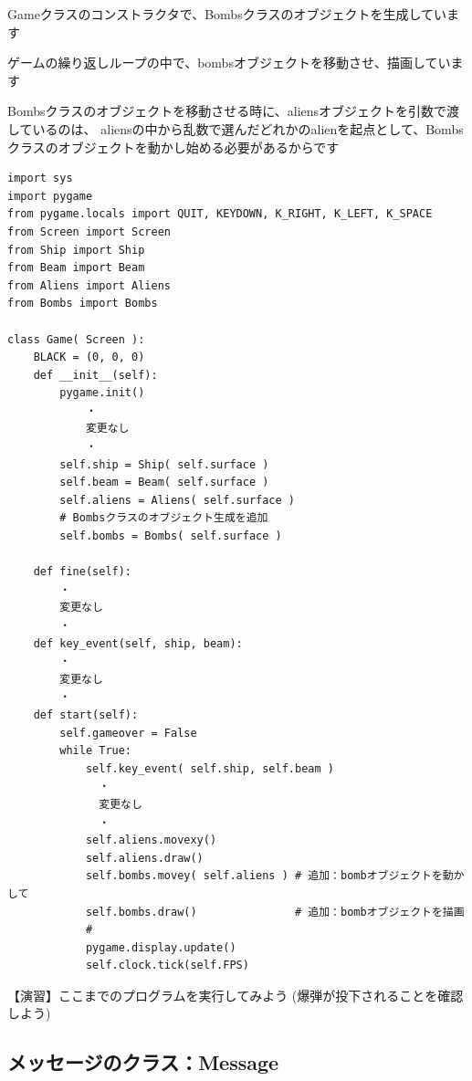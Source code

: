 \documentclass[uplatex,a4paper,11pt,oneside,openany]{jsbook}
\begin{document}
Gameクラスのコンストラクタで、Bombsクラスのオブジェクトを生成しています

ゲームの繰り返しループの中で、bombsオブジェクトを移動させ、描画しています

Bombsクラスのオブジェクトを移動させる時に、aliensオブジェクトを引数で渡しているのは、
aliensの中から乱数で選んだどれかのalienを起点として、Bombsクラスのオブジェクトを動かし始める必要があるからです

\begin{lstlisting}[caption=Gameクラス（bombオブジェクトを追加）,label=p001-3]
import sys
import pygame
from pygame.locals import QUIT, KEYDOWN, K_RIGHT, K_LEFT, K_SPACE
from Screen import Screen
from Ship import Ship
from Beam import Beam
from Aliens import Aliens
from Bombs import Bombs

class Game( Screen ):
    BLACK = (0, 0, 0)
    def __init__(self):
        pygame.init()
            ・
            変更なし
            ・
        self.ship = Ship( self.surface )
        self.beam = Beam( self.surface )
        self.aliens = Aliens( self.surface )
        # Bombsクラスのオブジェクト生成を追加
        self.bombs = Bombs( self.surface )

    def fine(self):
        ・
        変更なし
        ・
    def key_event(self, ship, beam):
        ・
        変更なし
        ・
    def start(self):
        self.gameover = False
        while True:
            self.key_event( self.ship, self.beam )
              ・
              変更なし
              ・
            self.aliens.movexy()
            self.aliens.draw()
            self.bombs.movey( self.aliens ) # 追加：bombオブジェクトを動かして
            self.bombs.draw()               # 追加：bombオブジェクトを描画
            #
            pygame.display.update()
            self.clock.tick(self.FPS)
\end{lstlisting}

【演習】ここまでのプログラムを実行してみよう
(爆弾が投下されることを確認しよう)

\subsection{メッセージのクラス：Message}
\end{document}
